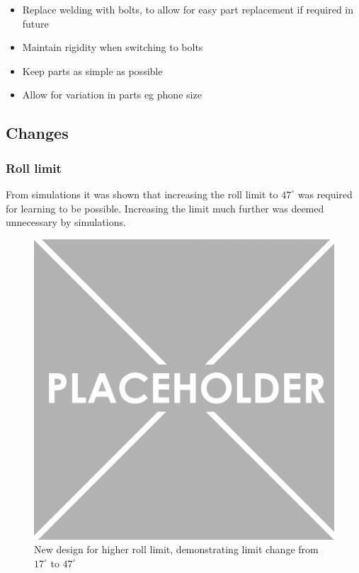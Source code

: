 \documentclass[twoside,twocolumn,12pt]{article}
\begin{document}
\begin{itemize}
\item Replace welding with bolts, to allow for easy part replacement if required in future
\item Maintain rigidity when switching to bolts
\item Keep parts as simple as possible
\item Allow for variation in parts eg phone size
\end{itemize}

\subsection{Changes}
\subsubsection{Roll limit}
From simulations it was shown that increasing the roll limit to $47^{\circ}$ was required for learning to be possible. Increasing the limit much further was deemed unnecessary by simulations.

\begin{figure}
  \centering
    \includegraphics[width=\linewidth]{place}
  \caption{New design for higher roll limit, demonstrating limit change from $17^{\circ}$ to $47^{\circ}$} 
  \label{fig:newline}
\end{figure}
\end{document}
